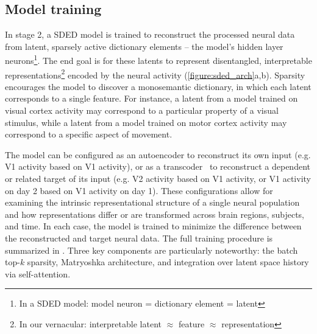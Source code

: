 \subsection{Model training}

In stage 2, a SDED model is trained to reconstruct the processed neural data from latent, sparsely active dictionary elements -- the model's hidden layer neurons\footnote{In a SDED model: model neuron = dictionary element = latent}. The end goal is for these latents to represent disentangled, interpretable representations\footnote{In our vernacular: interpretable latent $\approx$ feature $\approx$ representation} encoded by the neural activity (\autoref{figure:sded_arch}a,b). Sparsity encourages the model to discover a monosemantic dictionary, in which each latent corresponds to a single feature. For instance, a latent from a model trained on visual cortex activity may correspond to a particular property of a visual stimulus, while a latent from a model trained on motor cortex activity may correspond to a specific aspect of movement.

The model can be configured as an autoencoder to reconstruct its own input (e.g. V1 activity based on V1 activity), or as a transcoder~\cite{templeton_2024_future_acts, dunefsky_2024_transcoders} to reconstruct a dependent or related target of its input (e.g. V2 activity based on V1 activity, or V1 activity on day 2 based on V1 activity on day 1). These configurations allow for examining the intrinsic representational structure of a single neural population and how representations differ or are transformed across brain regions, subjects, and time. In each case, the model is trained to minimize the difference between the reconstructed and target neural data. The full training procedure is summarized in
. Three key components are particularly noteworthy: the batch top-$k$ sparsity, Matryoshka architecture, and integration over latent space history via self-attention.

